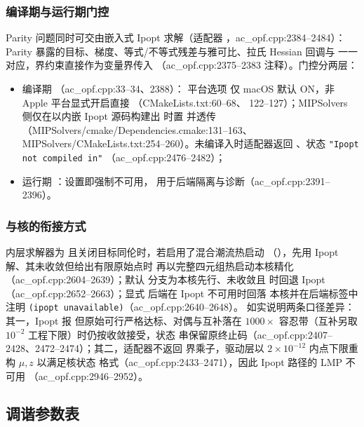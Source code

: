 \subsubsection*{编译期与运行期门控}
Parity 问题同时可交由嵌入式 Ipopt 求解（适配器
，ac\_opf.cpp:2384--2484）：Parity
 暴露的目标、梯度、等式/不等式残差与雅可比、拉氏 Hessian
回调与  一一对应，界约束直接作为变量界传入
（ac\_opf.cpp:2375--2383 注释）。门控分两层：
\begin{itemize}
  \item 编译期 （ac\_opf.cpp:33--34、2388）：
        平台选项  仅 macOS 默认 ON，非
        Apple 平台显式开启直接 （CMakeLists.txt:60--68、
        122--127）；MIPSolvers 侧仅在以内嵌 Ipopt 源码构建出
         时置  并透传
        （MIPSolvers/cmake/Dependencies.cmake:131--163、
        MIPSolvers/CMakeLists.txt:254--260）。未编译入时适配器返回
        、状态 \texttt{"Ipopt not compiled in"}
        （ac\_opf.cpp:2476--2482）；
  \item 运行期 ：设置即强制不可用，
        用于后端隔离与诊断（ac\_opf.cpp:2391--2396）。
\end{itemize}

\subsubsection*{与核的衔接方式}
内层求解器为  且关闭目标同伦时，若启用了混合潮流热启动
（），先用 Ipopt 解、其未收敛但给出有限原始点时
再以完整四元组热启动本核精化（ac\_opf.cpp:2604--2639）；默认 
分支为本核先行、未收敛且  时回退 Ipopt
（ac\_opf.cpp:2652--2663）；显式  后端在 Ipopt 不可用时回落
本核并在后端标签中注明 \texttt{(ipopt unavailable)}（ac\_opf.cpp:2640--2648）。
如实说明两条口径差异：其一，Ipopt 报
 但原始可行严格达标、对偶与互补落在
$1000\times$ 容忍带（互补另取 $10^{-2}$ 工程下限）时仍按收敛接受，状态
串保留原终止码（ac\_opf.cpp:2407--2428、2472--2474）；其二，适配器不返回
界乘子，驱动层以 $2\times10^{-12}$ 内点下限重构 $\mu,z$ 以满足核状态
格式（ac\_opf.cpp:2433--2471），因此 Ipopt 路径的 LMP 不可用
（ac\_opf.cpp:2946--2952）。

\subsection{调谐参数表}\label{subsec:pipm-params}

